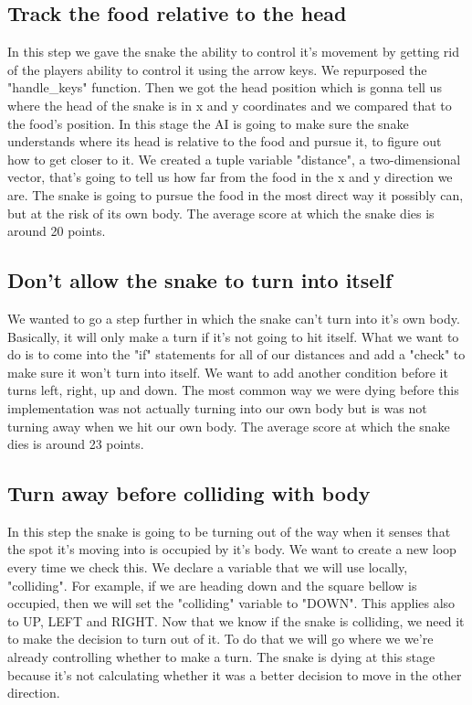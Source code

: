 \documentclass[a4paper,12pt]{report}
\begin{document}
\subsection{Track the food relative to the head}
In this step we gave the snake the ability to control it's movement by getting rid of the players ability to control it using the arrow keys. We repurposed the "handle\_keys" function. Then we got the head position which is gonna tell us where the head of the snake is in x and y coordinates and we compared that to the food's position. In this stage the AI is going to make sure the snake understands where its head is relative to the food and pursue it, to figure out how to get closer to it. We created a tuple variable "distance", a two-dimensional vector, that's going to tell us how far from the food in the x and y direction we are. The snake is going to pursue the food in the most direct way it possibly can, but at the risk of its own body. The average score at which the snake dies is around 20 points.
\subsection{Don't allow the snake to turn into itself}
We wanted to go a step further in which the snake can't turn into it's own body. Basically, it will only make a turn if it's not going to hit itself. What we want to do is to come into the "if" statements for all of our distances and add a "check" to make sure it won't turn into itself. We want to add another condition before it turns left, right, up and down. The most common way we were dying before this implementation was not actually turning into our own body but is was not turning away when we hit our own body. The average score at which the snake dies is around 23 points.
\subsection{Turn away before colliding with body}
In this step the snake is going to be turning out of the way when it senses that the spot it's moving into is occupied by it's body. We want to create a new loop every time we check this. We declare a variable that we will use locally, "colliding". For example, if we are heading down and the square bellow is occupied, then we will set the "colliding" variable to "DOWN". This applies also to UP, LEFT and RIGHT. Now that we know if the snake is colliding, we need it to make the decision to turn out of it. To do that we will go where we we're already controlling whether to make a turn. The snake is dying at this stage because it's not calculating whether it was a better decision to move in the other direction.
\end{document}
